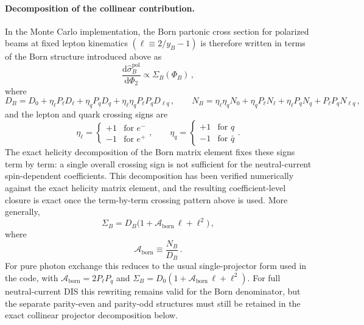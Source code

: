 \documentclass[a4paper,11pt]{article}
\begin{document}
\paragraph{Decomposition of the collinear contribution.}
In the Monte Carlo implementation, the Born partonic cross section for polarized beams at fixed lepton kinematics $(\ell \equiv 2/y_B - 1)$ is therefore written in terms of the Born structure introduced above as
\begin{equation}
  \frac{\mathrm{d}\hat\sigma_B^{\text{pol}}}{\mathrm{d}\Phi_2} \propto \Sigma_B(\Phi_B)\,,
\end{equation}
where
\begin{equation}
  D_B=D_0+\eta_\ell P_\ell D_\ell+\eta_q P_q D_q+\eta_\ell\eta_q P_\ell P_q D_{\ell q}\,,
  \qquad
  N_B=\eta_\ell\eta_q N_0+\eta_q P_\ell N_\ell+\eta_\ell P_q N_q+P_\ell P_q N_{\ell q}\,,
\end{equation}
and the lepton and quark crossing signs are
\begin{equation}
  \eta_\ell =
  \begin{cases}
    +1 & \text{for } e^- \\
    -1 & \text{for } e^+
  \end{cases},
  \qquad
  \eta_q =
  \begin{cases}
    +1 & \text{for } q \\
    -1 & \text{for } \bar q
  \end{cases}.
\end{equation}
The exact helicity decomposition of the Born matrix element fixes these signs term by term: a single overall crossing sign is not sufficient for the neutral-current spin-dependent coefficients.
This decomposition has been verified numerically against the exact helicity matrix element, and the resulting coefficient-level closure is exact once the term-by-term crossing pattern above is used.
More generally,
\begin{equation}
  \Sigma_B = D_B\bigl(1+\mathcal{A}_{\text{born}}\,\ell+\ell^2\bigr)\,,
\end{equation}
where
\begin{equation}
  \mathcal{A}_{\text{born}}\equiv \frac{N_B}{D_B}\,.
\end{equation}
For pure photon exchange this reduces to the usual single-projector form used in the code, with $\mathcal{A}_{\text{born}}=2P_\ell P_q$ and $\Sigma_B=D_0(1+\mathcal{A}_{\text{born}}\,\ell+\ell^2)$. For full neutral-current DIS this rewriting remains valid for the Born denominator, but the separate parity-even and parity-odd structures must still be retained in the exact collinear projector decomposition below.
\end{document}

